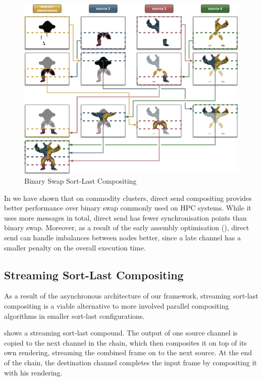\begin{figure}[h!t]\center
 \includegraphics[width=\columnwidth]{images/binarySwap}
 {\caption{\label{fBS}Binary Swap Sort-Last Compositing}}
\end{figure}

In \cite{EP:07} we have shown that on commodity clusters, direct send
compositing provides better performance over binary swap commonly used on HPC
systems. While it uses more messages in total, direct send has fewer
synchronisation points than binary swap. Moreover, as a result of the early
assembly optimisation (), direct send can handle imbalances
between nodes better, since a late channel has a smaller penalty on the overall
execution time.

\subsection{Streaming Sort-Last Compositing}

As a result of the asynchronous architecture of our framework, streaming sort-last
compositing is a viable alternative to more involved parallel compositing
algorithms in smaller sort-last configurations.

 shows a streaming sort-last compound. The output of one source
channel is copied to the next channel in the chain, which then composites it on
top of its own rendering, streaming the combined frame on to the next source.
At the end of the chain, the destination channel completes the input frame by
compositing it with his rendering.

